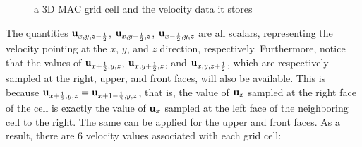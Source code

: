 \begin{figure}[!h]
\begin{tikzpicture}



        
         \end{tikzpicture}
    
    \caption{a 3D MAC grid cell and the velocity data it stores}
    \label{mac cell 1}
\end{figure}


The quantities $\u_{x,y,z-\frac{1}{2}}$, $\u_{x,y-\frac{1}{2},z}$, $\u_{x-\frac{1}{2},y,z}$ are all scalars, representing the velocity pointing at the $x$, $y$, and $z$ direction, respectively. Furthermore, notice that the values of $\u_{x+\frac{1}{2},y,z}$, $\u_{x,y+\frac{1}{2},z}$, and $\u_{x,y,z+\frac{1}{2}}$, which are respectively sampled at the right, upper, and front faces, will also be available. This is because $\u_{x+\frac{1}{2},y,z} = \u_{x+1-\frac{1}{2},y,z}$, that is, the value of $\u_x$ sampled at the right face of the cell is exactly the value of $\u_x$ sampled at the left face of the neighboring cell to the right. The same can be applied for the upper and front faces. As a result, there are 6 velocity values associated with each grid cell:

